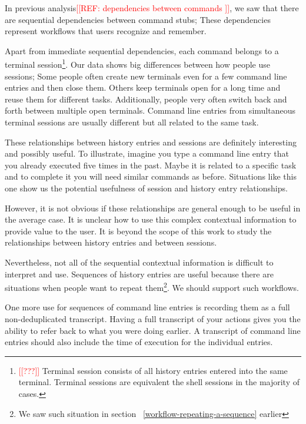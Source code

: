 \documentclass[thesis=M,english]{FITthesis}[2012/10/20]
\newcommand{\redtext}[1]{\textcolor{red}{[[#1]]}}
\let\myRef\ref
\renewcommand\ref{\unskip~\myRef}
\begin{document}
In previous analysis\redtext{REF: dependencies between commands }, we saw that there are sequential dependencies between command stubs; These dependencies represent workflows that users recognize and remember.

Apart from immediate sequential dependencies, each command belongs to a terminal session\footnote{\redtext{???} Terminal session consists of all history entries entered into the same terminal. Terminal sessions are equivalent the shell sessions in the majority of cases.}. Our data shows big differences between how people use sessions; Some people often create new terminals even for a few command line entries and then close them. Others keep terminals open for a long time and reuse them for different tasks.
Additionally, people very often switch back and forth between multiple open terminals. Command line entries from simultaneous terminal sessions are usually different but all related to the same task.

These relationships between history entries and sessions are definitely interesting and possibly useful. To illustrate, imagine you type a command line entry that you already executed five times in the past. Maybe it is related to a specific task and to complete it you will need similar commands as before. Situations like this one show us the potential usefulness of session and history entry relationships.

However, it is not obvious if these relationships are general enough to be useful in the average case. It is unclear how to use this complex contextual information to provide value to the user. It is beyond the scope of this work to study the relationships between history entries and between sessions.


Nevertheless, not all of the sequential contextual information is difficult to interpret and use. Sequences of history entries are useful because there are situations when people want to repeat them\footnote{We saw such situation in section \ref{workflow-repeating-a-sequence} earlier}. We should support such workflows.

One more use for sequences of command line entries is recording them as a full non-deduplicated transcript. Having a full transcript of your actions gives you the ability to refer back to what you were doing earlier. A transcript of command line entries should also include the time of execution for the individual entries.
\end{document}
